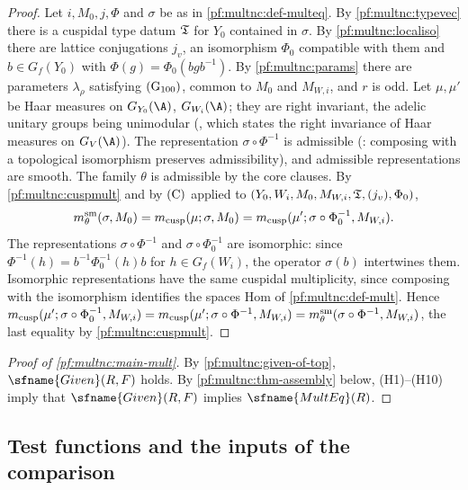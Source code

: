 \begin{proof}
Let $i,M_0,j,\Phi$ and $\sigma$ be as in \cref{pf:multnc:def-multeq}. By \cref{pf:multnc:typevec} there is a cuspidal
type datum $\mathfrak{T}$ for $Y_0$ contained in $\sigma$. By \cref{pf:multnc:localiso} there are lattice conjugations $j_v$,
an isomorphism $\Phi_0$ compatible with them and $b\in G_f(Y_0)$ with $\Phi(g)=\Phi_0(bgb^{-1})$. By \cref{pf:multnc:params}
there are parameters $\lambda_\rho$ satisfying $\textup{(G$_{100}$)}$, common to $M_0$ and $M_{W,i}$, and $r$ is odd. Let
$\mu,\mu'$ be Haar measures on $G_{Y_0}(\A)$, $G_{W_i}(\A)$; they are right invariant, the adelic unitary groups being
unimodular (, which states the right
invariance of Haar measures on $G_V(\A)$). The representation $\sigma\circ\Phi^{-1}$ is admissible
(: composing with a topological isomorphism preserves
admissibility), and admissible representations are smooth. The family $\theta$ is admissible by the core clauses. By
\cref{pf:multnc:cuspmult} and by $\textup{(C)}$ applied to $(Y_0,W_i,M_0,M_{W,i},\mathfrak{T},(j_v),\Phi_0)$,
\[
m^{\mathrm{sm}}_\theta(\sigma,M_0)=m_{\mathrm{cusp}}(\mu;\sigma,M_0)=m_{\mathrm{cusp}}(\mu';\sigma\circ\Phi_0^{-1},M_{W,i}).
\]
The representations $\sigma\circ\Phi^{-1}$ and $\sigma\circ\Phi_0^{-1}$ are isomorphic: since
$\Phi^{-1}(h)=b^{-1}\Phi_0^{-1}(h)b$ for $h\in G_f(W_i)$, the operator $\sigma(b)$ intertwines them. Isomorphic
representations have the same cuspidal multiplicity, since composing with the isomorphism identifies the spaces
$\mathrm{Hom}$ of \cref{pf:multnc:def-mult}. Hence $m_{\mathrm{cusp}}(\mu';\sigma\circ\Phi_0^{-1},M_{W,i})=
m_{\mathrm{cusp}}(\mu';\sigma\circ\Phi^{-1},M_{W,i})=m^{\mathrm{sm}}_\theta(\sigma\circ\Phi^{-1},M_{W,i})$, the last equality by
\cref{pf:multnc:cuspmult}.
\end{proof}

\begin{proof}[Proof of \cref{pf:multnc:main-mult}]
By \cref{pf:multnc:given-of-top}, $\sfname{Given}(R,F)$ holds. By \cref{pf:multnc:thm-assembly} below, (H1)--(H10) imply
that $\sfname{Given}(R,F)$ implies $\sfname{MultEq}(R)$.
\end{proof}


\subsection{Test functions and the inputs of the comparison}\label{pf:multnc:sec-inputs}

